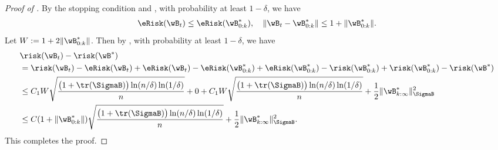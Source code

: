 \documentclass[11pt]{article}
\begin{document}
\begin{proof}[Proof of ]
By the stopping condition and , with probability at least $1-\delta$, we have 
\begin{align*}
\eRisk(\wB_t)\le \eRisk(\wB^*_{0:k}),\quad \|\wB_t-\wB^*_{0:k}\|\le 1 + \|\wB^*_{0:k}\|.
\end{align*}
Let $W:= 1+2\|\wB^*_{0:k}\|$.
Then by , with probability at least $1-\delta$, we have
\begin{align*}
&\lefteqn{\risk(\wB_t)-\risk(\wB^*) }\\
&= \risk(\wB_t)-\eRisk(\wB_t) + \eRisk(\wB_t)-\eRisk(\wB^*_{0:k}) + \eRisk(\wB^*_{0:k})-\risk(\wB^*_{0:k}) + \risk(\wB^*_{0:k}) -  \risk(\wB^*) \\  
&\le C_1 W \sqrt{\frac{ \big(1+\tr(\SigmaB)\big) \ln(n/\delta)\ln(1/\delta)}{n}} + 0 + C_1 W \sqrt{\frac{ \big(1+\tr(\SigmaB)\big) \ln(n/\delta)\ln(1/\delta)}{n}} + \frac{1}{2} \|\wB^*_{k:\infty}\|^2_{\SigmaB} \\ 
&\le C (1+\|\wB^*_{0:k}\|) \sqrt{\frac{ \big(1+\tr(\SigmaB)\big) \ln(n/\delta)\ln(1/\delta)}{n}}  + \frac{1}{2} \|\wB^*_{k:\infty}\|^2_{\SigmaB}.
\end{align*}
This completes the proof.
\end{proof}
\end{document}
